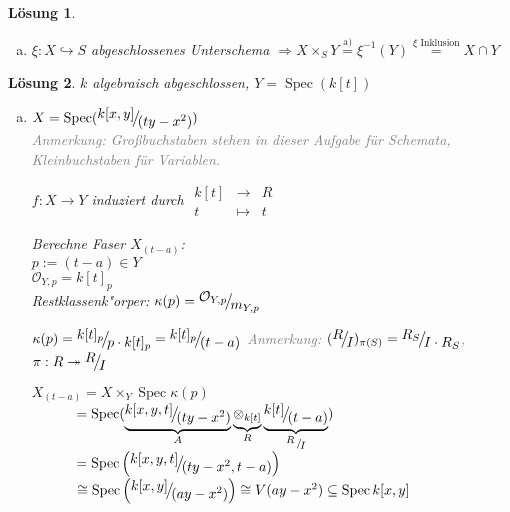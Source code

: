 \documentclass[paper = A4, fontsize=12pt, numbers=noendperiod, chapterprefix=true]{scrbook}
\theoremstyle{break}
\newtheorem{Loes}{L\"osung}
\theoremstyle{nonumberbreak}
\theoremstyle{nonumberplain}
\DeclareMathOperator{\Spec}{Spec}
\newcommand{\calO}{\mathcal{O}}
\newcommand{\X}{\times}
\newcommand{\FakRaum}[2]{
  \raisebox{0.7ex}{\ensuremath{#1}}
  \ensuremath{\mkern-3mu}\big/\ensuremath{\mkern-3mu}
  \raisebox{-0.6ex}{\ensuremath{#2}}}
\begin{document}
\begin{Loes}
\begin{enumerate}[a)]
\begin{center}
\end{center}
	
	$X \X_S Y = \bigcup\limits_{i \in I} X \X_S Y \overset{\text{Vorl.}}{=} \bigcup\limits_{i \in I} X_i \X_{S_i} Y_i \overset{\text{s. o.}}{=} \bigcup\limits_{i\in I} \xi^{-1} (Y_i) = \xi^{-1} (\bigcup\limits_{i\in I} Y_i) = \xi^{-1}(Y)$
\item
	$\xi: X \hookrightarrow S$ abgeschlossenes Unterschema $\Rightarrow X \X_S Y \overset{\text{a)}}{=} \xi^{-1}(Y) \overset{\xi \text{ Inklusion}}{=} X \cap Y$
\end{enumerate}\end{Loes}

\begin{Loes}
$k$ algebraisch abgeschlossen, $Y = \Spec(k[t])$
\begin{enumerate}[a)]
\item
	$X = \Spec (\FakRaum{k[x,y]}{(ty-x^2)})$\\
	\textcolor{gray}{Anmerkung: Gro\ss buchstaben stehen in dieser Aufgabe f\"ur Schemata, Kleinbuchstaben f\"ur Variablen.}
	
	$f: X \to Y$ induziert durch $\begin{array}{ccc} k[t] &\to& R \\ t &\mapsto& t\end{array}$
	
	Berechne Faser $X_{(t-a)}$:\\
	$p:= (t-a) \in Y$\\
	$\calO_{Y,p} = k[t]_p$\\
	Restklassenk"orper: $\kappa(p) = \FakRaum{\calO_{Y,p}}{m_{Y,p}}$
	
	$\kappa(p) = \FakRaum{k[t]_p}{p \cdot k[t]_p} = \FakRaum{k[t]_p}{(t-a)}$ \textcolor{gray}{Anmerkung: $(\FakRaum{R}{I})_{\pi(S)} = \FakRaum{R_S}{I\cdot R_S}$, $\pi: R \twoheadrightarrow \FakRaum{R}{I}$}
	
	$X_{(t-a)} = X \X_Y \Spec \kappa(p)$\\
	$\textcolor{white}{X_{(t-a)}} = \Spec( \underbrace{\FakRaum{k[x,y,t]}{(ty-x^2)}}_{A} \underbrace{\otimes_{k[t]}}_{R} \underbrace{\FakRaum{k[t]}{(t-a)}}_{\scriptsize{\raisebox{0.7ex}{\ensuremath{R}}\ensuremath{\mkern-3mu}\ / \ensuremath{\mkern-3mu}\raisebox{-0.6ex}{\ensuremath{I}}}})$\\
	$\textcolor{white}{X_{(t-a)}} = \Spec\left(\FakRaum{k[x,y,t]}{(ty - x^2, t-a)}\right)$\\
	$\textcolor{white}{X_{(t-a)}} \cong \Spec\left(  \FakRaum{k[x,y]}{(ay-x^2)} \right) \cong V(ay-x^2) \subseteq \Spec k[x,y]$
	

\end{enumerate}
\end{Loes}
\end{document}
